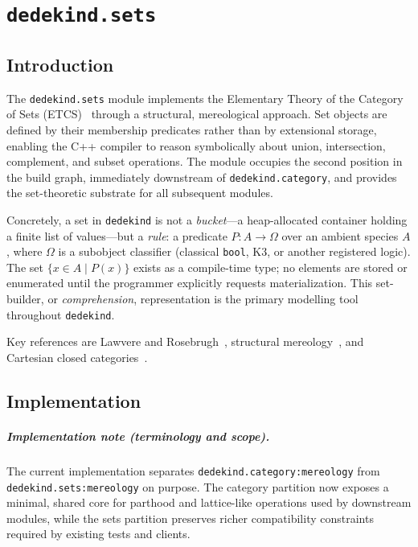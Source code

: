 \documentclass[11pt, a4paper]{report}
\begin{document}
\chapter{\texttt{dedekind.sets}}
\label{chap:sets}

\section{Introduction}
\label{sec:sets-intro}

The \texttt{dedekind.sets} module implements the Elementary Theory of the Category of Sets (ETCS)~\cite{lawvere1964etcs, lawvere2003sets} through a structural, mereological approach. Set objects are defined by their membership predicates rather than by extensional storage, enabling the C++ compiler to reason symbolically about union, intersection, complement, and subset operations. The module occupies the second position in the build graph, immediately downstream of \texttt{dedekind.category}, and provides the set-theoretic substrate for all subsequent modules.

Concretely, a set in \texttt{dedekind} is not a \emph{bucket}---a heap-allocated container holding a finite list of values---but a \emph{rule}: a predicate $P : A \to \Omega$ over an ambient species $A$, where $\Omega$ is a subobject classifier (classical \texttt{bool}, K3, or another registered logic). The set $\{x \in A \mid P(x)\}$ exists as a compile-time type; no elements are stored or enumerated until the programmer explicitly requests materialization. This set-builder, or \emph{comprehension}, representation is the primary modelling tool throughout \texttt{dedekind}.

Key references are Lawvere and Rosebrugh~\cite{lawvere2003sets}, structural mereology~\cite{mormann2013structural}, and Cartesian closed categories~\cite{lambek1988introduction}.

\section{Implementation}
\label{sec:sets-impl}

\paragraph{Implementation note (terminology and scope).}
The current implementation separates \texttt{dedekind.category:mereology} from
\texttt{dedekind.sets:mereology} on purpose. The category partition now exposes
a minimal, shared core for parthood and lattice-like operations used by
downstream modules, while the sets partition preserves richer compatibility
constraints required by existing tests and clients.
\end{document}
